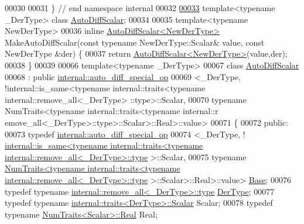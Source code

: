 \begin{DoxyCode}
00030 
00031 \} \textcolor{comment}{// end namespace internal}
00032 
\hyperlink{class_eigen_1_1_auto_diff_scalar}{00033} \textcolor{keyword}{template}<\textcolor{keyword}{typename} \_DerType> \textcolor{keyword}{class }\hyperlink{class_eigen_1_1_auto_diff_scalar}{AutoDiffScalar};
00034 
00035 \textcolor{keyword}{template}<\textcolor{keyword}{typename} NewDerType>
00036 \textcolor{keyword}{inline} \hyperlink{class_eigen_1_1_auto_diff_scalar}{AutoDiffScalar<NewDerType>} MakeAutoDiffScalar(\textcolor{keyword}{const} \textcolor{keyword}{typename} 
      NewDerType::Scalar& value, \textcolor{keyword}{const} NewDerType &der) \{
00037   \textcolor{keywordflow}{return} \hyperlink{class_eigen_1_1_auto_diff_scalar}{AutoDiffScalar<NewDerType>}(value,der);
00038 \}
00039 
00066 \textcolor{keyword}{template}<\textcolor{keyword}{typename} \_DerType>
00067 \textcolor{keyword}{class }\hyperlink{class_eigen_1_1_auto_diff_scalar}{AutoDiffScalar}
00068   : \textcolor{keyword}{public} \hyperlink{struct_eigen_1_1internal_1_1auto__diff__special__op}{internal::auto\_diff\_special\_op}
00069             <\_DerType, !internal::is\_same<typename internal::traits<typename internal::remove\_all<\_DerType>
      ::type>::Scalar,
00070                                           typename NumTraits<typename internal::traits<typename internal::r
      emove\_all<\_DerType>::type>::Scalar>::Real>::value>
00071 \{
00072   \textcolor{keyword}{public}:
00073     \textcolor{keyword}{typedef} \hyperlink{struct_eigen_1_1internal_1_1auto__diff__special__op}{internal::auto\_diff\_special\_op}
00074             <\_DerType, !
      \hyperlink{struct_eigen_1_1internal_1_1is__same}{internal::is\_same<typename internal::traits<typename internal::remove\_all<\_DerType>::type}
      >::Scalar,
00075                        \textcolor{keyword}{typename} 
      \hyperlink{group___core___module_struct_eigen_1_1_num_traits}{NumTraits<typename internal::traits<typename internal::remove\_all<\_DerType>::type}
      >::Scalar>::Real>::value> \hyperlink{struct_eigen_1_1internal_1_1auto__diff__special__op}{Base};
00076     \textcolor{keyword}{typedef} \textcolor{keyword}{typename} \hyperlink{group___sparse_core___module}{internal::remove\_all<\_DerType>::type} 
      \hyperlink{group___sparse_core___module}{DerType};
00077     \textcolor{keyword}{typedef} \textcolor{keyword}{typename} \hyperlink{struct_eigen_1_1internal_1_1traits}{internal::traits<DerType>::Scalar} Scalar;
00078     \textcolor{keyword}{typedef} \textcolor{keyword}{typename} \hyperlink{group___core___module_struct_eigen_1_1_num_traits}{NumTraits<Scalar>::Real} Real;

\end{DoxyCode}
